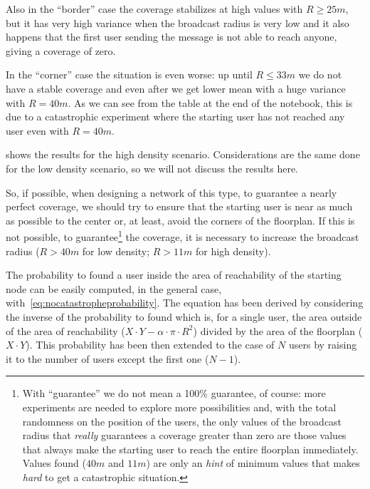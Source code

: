 Also in the ``border'' case the coverage stabilizes at high values with \(R \ge
25m\), but it has very high variance when the broadcast radius is very low and
it also happens that the first user sending the message is not able to reach
anyone, giving a coverage of zero.

In the ``corner'' case the situation is even worse: up until \(R \le 33m\) we
do not have a stable coverage and even after we get lower mean with a huge
variance with \(R\!=\!40m\). As we can see from the table at the end of the
notebook, this is due to a catastrophic experiment where the starting user has
not reached any user even with \(R\!=\!40m\).

 shows the results for the high density
scenario. Considerations are the same done for the low density scenario, so we
will not discuss the results here.

So, if possible, when designing a network of this type, to guarantee a nearly
perfect coverage, we should try to ensure that the starting user is near as much
as possible to the center or, at least, avoid the corners of the floorplan. If
this is not possible, to guarantee\footnote{With ``guarantee'' we do not mean a
100\% guarantee, of course: more experiments are needed to explore more
possibilities and, with the total randomness on the position of the users, the
only values of the broadcast radius that \emph{really} guarantees a coverage
greater than zero are those values that always make the starting user to reach
the entire floorplan immediately. Values found (\(40m\) and \(11m\)) are only an
\emph{hint} of minimum values that makes \emph{hard} to get a catastrophic
situation.} the coverage, it is necessary to increase the broadcast radius (\(R
> 40m\) for low density; \(R > 11m\) for high density).

The probability to found a user inside the area of reachability of the starting
node  can be easily
computed, in the general case, with~\eqref{eq:nocatastropheprobability}. The
equation has been derived by considering the inverse of the probability to found
 which is, for a single user, the area outside of the area of
reachability (\(X\cdot Y - \alpha\cdot\pi\cdot R^2\)) divided by the area of the
floorplan (\(X\cdot Y\)). This probability has been then extended to the case of
\(N\) users by raising it to the number of users except the first one (\(N-1\)).

